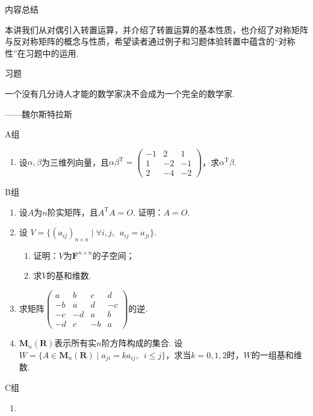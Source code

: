\vspace{2ex}
\centerline{\heiti \Large 内容总结}

本讲我们从对偶引入转置运算，并介绍了转置运算的基本性质，也介绍了对称矩阵与反对称矩阵的概念与性质，希望读者通过例子和习题体验转置中蕴含的``对称性''在习题中的运用.

\vspace{2ex}
\centerline{\heiti \Large 习题}

\vspace{2ex}
{\kaishu 一个没有几分诗人才能的数学家决不会成为一个完全的数学家. }
\begin{flushright}
    \kaishu
    ——魏尔斯特拉斯
\end{flushright}

\centerline{\heiti A组}
\begin{enumerate}
    \item 设$\alpha,\beta$为三维列向量，且$\alpha\beta^\mathrm{T}=\begin{pmatrix}
                  -1 & 2  & 1  \\
                  1  & -2 & -1 \\
                  2  & -4 & -2
              \end{pmatrix}$，求$\alpha^\mathrm{T}\beta$.
\end{enumerate}

\centerline{\heiti B组}
\begin{enumerate}
    \item 设$A$为$n$阶实矩阵，且$A^\mathrm{T}A=O$. 证明：$A=O$.

    \item 设 $V=\{(a_{ij})_{n \times n} \mid \forall i,j,\enspace a_{ij}=a_{ji}\}$.
          \begin{enumerate}
              \item 证明：$V$为$\mathbf{F}^{n \times n}$的子空间；

              \item 求$V$的基和维数.
          \end{enumerate}

    \item 求矩阵$\begin{pmatrix}
                  a  & b  & c  & d  \\
                  -b & a  & d  & -c \\
                  -c & -d & a  & b  \\
                  -d & c  & -b & a
              \end{pmatrix}$的逆.

    \item $\mathbf{M}_n(\mathbf{R})$表示所有实$n$阶方阵构成的集合. 设$W=\{A\in \mathbf{M}_n(\mathbf{R}) \mid a_{ji}=ka_{ij},\enspace i \leqslant j\}$，求当$k=0,1,2$时，$W$的一组基和维数.
\end{enumerate}

\centerline{\heiti C组}
\begin{enumerate}
    \item
\end{enumerate}
